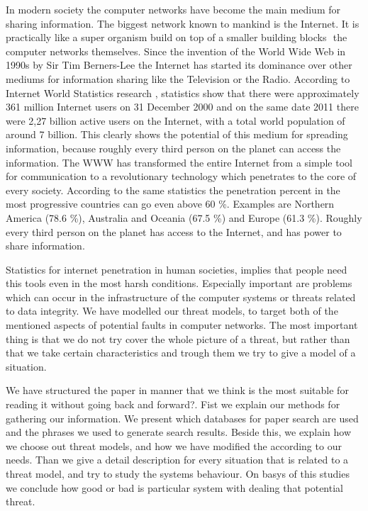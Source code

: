 In modern society the computer networks have become the main medium for sharing information. The  biggest network known to mankind is the Internet. It is practically like a super organism build on top of a smaller building blocks  the computer networks themselves. Since the invention of the World Wide Web in 1990s by Sir Tim Berners-Lee \cite{web:timbernerslee} the Internet has started its dominance over other mediums for information sharing like the Television or the Radio. According to Internet World Statistics research \cite{web:internetworldstats}, statistics show that there were approximately 361 million Internet users on 31 December 2000 and on the same date 2011 there were 2,27 billion active users on the Internet, with a total world population of around 7 billion. This clearly shows the potential of this medium for spreading information, because roughly every third person on the planet can access the information. The WWW has transformed the entire Internet from a simple tool for communication to a revolutionary technology which penetrates to the core of every society. According to the same statistics \cite{web:internetworldstats} the penetration percent in the most progressive countries can go even above 60 \%. Examples are Northern America (78.6 \%), Australia and Oceania (67.5 \%) and Europe (61.3 \%). Roughly every third person on the planet has access to the Internet, and has power to share information. 

Statistics for internet penetration in human societies, implies that people need this tools even in the most harsh conditions. Especially important are problems which can occur in the infrastructure of the computer systems or threats related to data integrity. We have modelled our threat models, to target both of the mentioned aspects of potential faults in computer networks. The most important thing is that we do not try cover the whole picture of a threat, but rather than that we take certain characteristics and trough them we try to give a model of a situation.

We have structured the paper in manner that we think is the most suitable for reading it without going back and forward?. Fist we explain our methods for gathering our information. We present which databases for paper search are used and the phrases we used to generate search results. Beside this, we explain how we choose out threat models, and how we have modified the according to our needs. Than we give a detail description for every situation that is related to a threat model, and try to study the systems behaviour. On basys of this studies we conclude how good or bad is particular system with dealing that potential threat.
 
